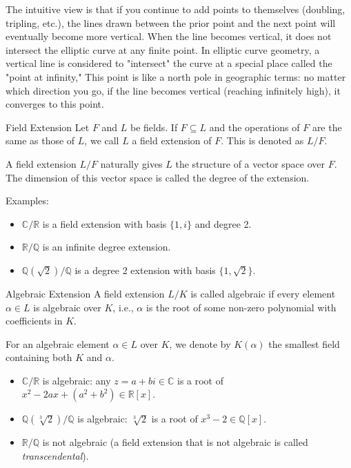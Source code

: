 \documentclass{article}
\begin{document}
The intuitive view is that if you continue to add points to themselves (doubling, tripling, etc.), the lines drawn between the prior point and the next point will eventually become more vertical. When the line becomes vertical, it does not intersect the elliptic curve at any finite point. In elliptic curve geometry, a vertical line is considered to "intersect" the curve at a special place called the "point at infinity," This point is like a north pole in geographic terms: no matter which direction you go, if the line becomes vertical (reaching infinitely high), it converges to this point.

\begin{definition}{Field Extension}{}
    Let $F$ and $L$ be fields. If $F \subseteq L$ and the operations of $F$ are the same as those of $L$, we call $L$ a field extension of $F$. This is denoted as $L/F$.
\end{definition}

A field extension $L/F$ naturally gives $L$ the structure of a vector space over $F$. The dimension of this vector space is called the degree of the extension.

Examples:
\begin{itemize}
    \item $\mathbb{C}/\mathbb{R}$ is a field extension with basis $\{1, i\}$ and degree 2.
    \item $\mathbb{R}/\mathbb{Q}$ is an infinite degree extension.
    \item $\mathbb{Q}(\sqrt{2})/\mathbb{Q}$ is a degree 2 extension with basis $\{1, \sqrt{2}\}$.
\end{itemize}

\begin{definition}{Algebraic Extension}{}
    A field extension $L/K$ is called algebraic if every element $\alpha \in L$ is algebraic over $K$, i.e., $\alpha$ is the root of some non-zero polynomial with coefficients in $K$.

    For an algebraic element $\alpha \in L$ over $K$, we denote by $K(\alpha)$ the smallest field containing both $K$ and $\alpha$.
\end{definition}

\begin{itemize}
    \item $\mathbb{C}/\mathbb{R}$ is algebraic: any $z = a + bi \in \mathbb{C}$ is a root of $x^2 - 2ax + (a^2 + b^2) \in \mathbb{R}[x]$.
    \item $\mathbb{Q}(\sqrt[3]{2})/\mathbb{Q}$ is algebraic: $\sqrt[3]{2}$ is a root of $x^3 - 2 \in \mathbb{Q}[x]$.
    \item $\mathbb{R}/\mathbb{Q}$ is not algebraic (a field extension that is not algebraic is called \textit{transcendental}).
\end{itemize}
\end{document}
